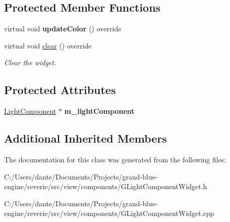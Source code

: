 \subsection*{Protected Member Functions}
\begin{DoxyCompactItemize}
\item 
\mbox{\label{classrev_1_1_view_1_1_light_diffuse_color_widget_ac33dc98fb17a1a8910dea2afb7a3f54c}} 
virtual void {\bfseries update\+Color} () override
\item 
\mbox{\label{classrev_1_1_view_1_1_light_diffuse_color_widget_a61fa1913aed961b45510f3bf7a7af4a8}} 
virtual void \mbox{\hyperlink{classrev_1_1_view_1_1_light_diffuse_color_widget_a61fa1913aed961b45510f3bf7a7af4a8}{clear}} () override
\begin{DoxyCompactList}\small\item\em Clear the widget. \end{DoxyCompactList}\end{DoxyCompactItemize}
\subsection*{Protected Attributes}
\begin{DoxyCompactItemize}
\item 
\mbox{\label{classrev_1_1_view_1_1_light_diffuse_color_widget_a111151f689517525e77ad494ec12c51f}} 
\mbox{\hyperlink{classrev_1_1_light_component}{Light\+Component}} $\ast$ {\bfseries m\+\_\+light\+Component}
\end{DoxyCompactItemize}
\subsection*{Additional Inherited Members}


The documentation for this class was generated from the following files\+:\begin{DoxyCompactItemize}
\item 
C\+:/\+Users/dante/\+Documents/\+Projects/grand-\/blue-\/engine/reverie/src/view/components/G\+Light\+Component\+Widget.\+h\item 
C\+:/\+Users/dante/\+Documents/\+Projects/grand-\/blue-\/engine/reverie/src/view/components/G\+Light\+Component\+Widget.\+cpp\end{DoxyCompactItemize}

